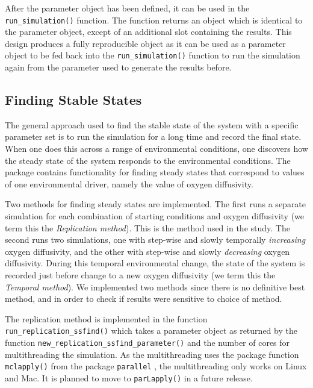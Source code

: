 \documentclass[]{elsarticle} %
\begin{document}
After the parameter object has been defined, it can be used in the
\texttt{run\_simulation()} function. The function returns an object
which is identical to the parameter object, except of an additional slot
containing the results. This design produces a fully reproducible object
as it can be used as a parameter object to be fed back into the
\texttt{run\_simulation()} function to run the simulation again from the
parameter used to generate the results before.

\hypertarget{finding-stable-states}{%
\subsection{Finding Stable States}\label{finding-stable-states}}

The general approach used to find the stable state of the system with a
specific parameter set is to run the simulation for a long time and
record the final state. When one does this across a range of
environmental conditions, one discovers how the steady state of the
system responds to the environmental conditions. The package contains
functionality for finding steady states that correspond to values of one
environmental driver, namely the value of oxygen diffusivity.

Two methods for finding steady states are implemented. The first runs a
separate simulation for each combination of starting conditions and
oxygen diffusivity (we term this the \emph{Replication method}). This is
the method used in the \citet{Bush2017} study. The second runs two
simulations, one with step-wise and slowly temporally \emph{increasing}
oxygen diffusivity, and the other with step-wise and slowly
\emph{decreasing} oxygen diffusivity. During this temporal environmental
change, the state of the system is recorded just before change to a new
oxygen diffusivity (we term this the \emph{Temporal method}). We
implemented two methods since there is no definitive best method, and in
order to check if results were sensitive to choice of method.

The replication method is implemented in the function
\texttt{run\_replication\_ssfind()} which takes a parameter object as
returned by the function \texttt{new\_replication\_ssfind\_parameter()}
and the number of cores for multithreading the simulation. As the
multithreading uses the package function \texttt{mclapply()} from the
package \texttt{parallel} \citep{RCoreTeam2022}, the multithreading only
works on Linux and Mac. It is planned to move to \texttt{parLapply()}
\citep{RCoreTeam2022} in a future release.
\end{document}
